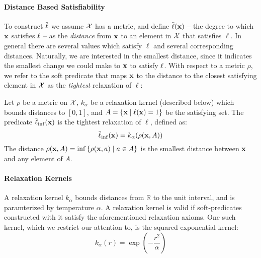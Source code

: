 \paragraph{Distance Based Satisfiability}
To construct $\mathrel{\tilde{\operatorname{\ell}}}$ we assume ${\mathcal{X}}$ has a metric, and define $\tilde{\operatorname{\ell}}(\mathbf{x})$ -- the degree to which $\mathbf{x}$ satisfies $\operatorname{\ell}$ -- as the \emph{distance} from $\mathbf{x}$ to an element in ${\mathcal{X}}$ that satisfies $\ell$.
In general there are several values which satisfy $\ell$ and several corresponding distances.
Naturally, we are interested in the smallest distance, since it indicates the smallest change we could make to $\mathbf{x}$ to satisfy $\operatorname{\ell}$.
With respect to a metric $\rho$, we refer to the soft predicate that maps $\mathbf{x}$ to the distance to the closest satisfying element in ${\mathcal{X}}$ as the \emph{tightest} relaxation of $\ell$:

\begin{definition}
Let $\rho$ be a metric on ${\mathcal{X}}$, $k_\alpha$ be a relaxation kernel (described below) which bounds distances to $[0, 1]$, and $A = \{\mathbf{x} \mid \operatorname{\ell}(\mathbf{x}) = 1\}$ be the satisfying set.
The predicate $\tilde{\operatorname{\ell}}_{\inf}(\mathbf{x})$ is the tightest relaxation of $\ell$, defined as:
\begin{equation}\label{eq;linf}
\tilde{\operatorname{\ell}}_{\inf}(\mathbf{x}) = k_\alpha(\rho(\mathbf{x}, A))
\end{equation}
The distance $\rho(\mathbf{x}, A) = \inf \left\{\rho(\mathbf{x}, a) \mid a \in A\right\}$ is the smallest distance between $\mathbf{x}$ and any element of $A$.
\end{definition}



\paragraph{Relaxation Kernels} A relaxation kernel $k_\alpha$ bounds distances from $\mathbb{R}$ to the unit interval, and is paramterized by temperature $\alpha$.
A relaxation kernel is valid if soft-predicates constructed with it satisfy the aforementioned relaxation axioms.
One such kernel, which we restrict our attention to, is the squared exponential kernel:
\begin{equation}
k_{\alpha}(r) = \exp\left(-\frac{r^2}{\alpha}\right)
\end{equation}




